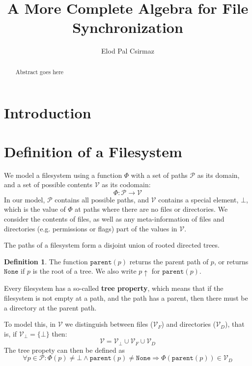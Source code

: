 \documentclass[12pt]{article}
\title{A More Complete Algebra for File Synchronization}
\author{Elod Pal Csirmaz}
\newcommand{\setv}{\mathcal{V}}
\newcommand{\setvx}[1]{\mathcal{V}_{#1}}
\newcommand{\setf}{\setvx{F}}
\newcommand{\setd}{\setvx{D}}
\newcommand{\setb}{\setvx{\empt}}
\newcommand{\setp}{\mathcal{P}}
\newcommand{\empt}{\bot}
\newcommand{\parent}{\mathtt{parent}}
\newcommand{\toppath}{\mathtt{None}} %
\newcommand{\FS}{\Phi} %
\newcommand{\pp}{p\!\!\uparrow} %
\theoremstyle{definition}
\newtheorem{mydef}{Definition}
\begin{document}
\maketitle
\begin{abstract}
Abstract goes here
\end{abstract}

\section{Introduction}


\section{Definition of a Filesystem}

We model a filesystem using a function $\FS$ with a set of paths $\setp$ as its domain,
and a set of possible contents $\setv$ as its codomain:
\[ \FS : \setp \rightarrow \setv \] 
In our model, $\setp$ contains all possible paths, and $\setv$ contains a special
element, $\empt$, which is the value of $\FS$ at paths where there are no files
or directories.
We consider the contents of files, as well as any meta-information of files
and directories (e.g. permissions or flags) part of the values in $\setv$.

The paths of a filesystem form a disjoint union of rooted directed trees.
\begin{mydef}
The function $\parent(p)$ returns the parent path of $p$, or
returns $\toppath$ if $p$ is the root of a tree.
We also write $\pp$ for $\parent(p)$.
\end{mydef}

Every filesystem has a so-called \textbf{tree property}, which means that
if the filesystem is not empty at a path, and the path has a parent,
then there must be a directory at the parent path.

To model this, in $\setv$ we distinguish between files ($\setf$) and directories ($\setd$), that is,
if $\setb = \{\empt\}$ then:
\[ \setv = \setb \cup \setf \cup \setd \]
The tree propety can then be defined as
\[ \forall p\in\setp : \FS(p) \neq \empt \wedge \parent(p) \neq \toppath \Rightarrow \FS(\parent(p)) \in \setd \]
\end{document}
